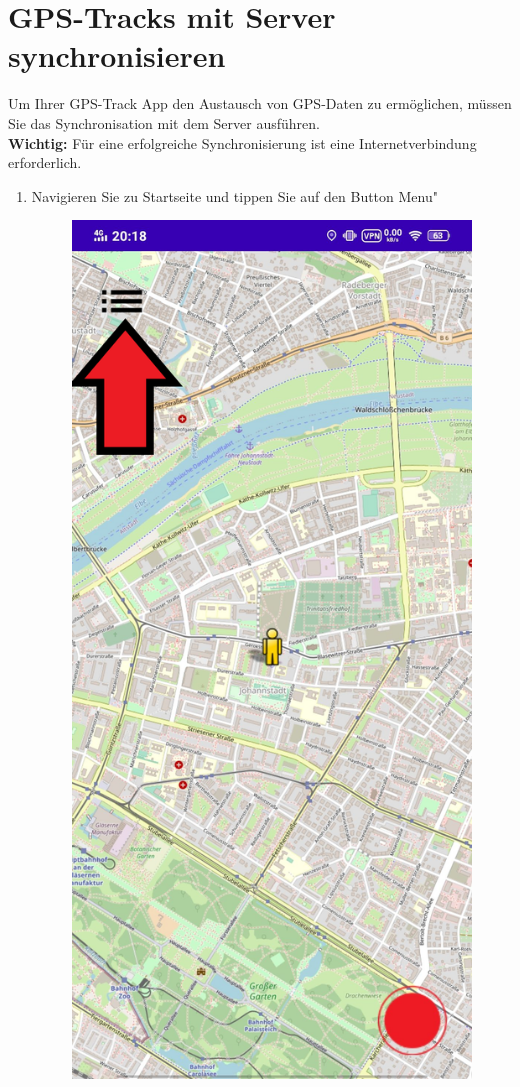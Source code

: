 \documentclass{article}
\begin{document}
\section{GPS-Tracks mit Server synchronisieren}
    Um Ihrer  GPS-Track App den Austausch von GPS-Daten zu ermöglichen, müssen Sie das Synchronisation mit dem Server ausführen.
    \\\textbf{Wichtig:} Für eine erfolgreiche Synchronisierung ist eine Internetverbindung erforderlich.
    \begin{enumerate}
        \item Navigieren Sie zu Startseite und tippen Sie auf den Button \glqq Menu"\\
        \begin{figure}[H]
            \includegraphics[scale=0.15]{1.png}

\end{figure}
\end{enumerate}
\end{document}
